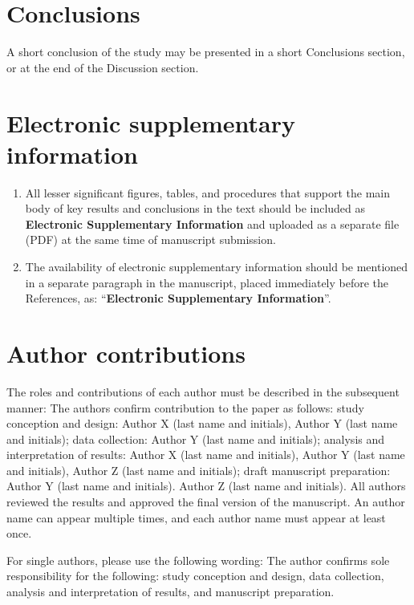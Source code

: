 \documentclass[12pt,a4paper]{article}
\begin{document}
\section{Conclusions}
A short conclusion of the study may be presented in a short Conclusions section, or at the end of the Discussion section.
\section{Electronic supplementary information}

\begin{enumerate}
    \item[\textbf{a.}] All lesser significant figures, tables, and procedures that support the main body of key results and conclusions in the text should be included as \textbf{Electronic Supplementary Information} and uploaded as a separate file (PDF) at the same time of manuscript submission.

    \item[\textbf{b.}] The availability of electronic supplementary information should be mentioned in a separate paragraph in the manuscript, placed immediately before the References, as: “\textbf{Electronic Supplementary Information}”.
\end{enumerate}

\section{Author contributions}

The roles and contributions of each author must be described in the subsequent manner: The authors confirm contribution to the paper as follows: study conception and design: Author X (last name and initials), Author Y (last name and initials); data collection: Author Y (last name and initials); analysis and interpretation of results: Author X (last name and initials), Author Y (last name and initials), Author Z (last name and initials); draft manuscript preparation: Author Y (last name and initials). Author Z (last name and initials). All authors reviewed the results and approved the final version of the manuscript. An author name can appear multiple times, and each author name must appear at least once.

For single authors, please use the following wording: The author confirms sole responsibility for the following: study conception and design, data collection, analysis and interpretation of results, and manuscript preparation.
\end{document}
